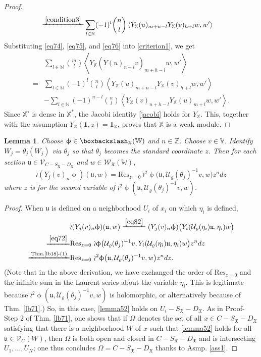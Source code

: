 \documentclass[11pt,b5paper,notitlepage]{article}
\theoremstyle{definition}
\theoremstyle{plain}
\newtheorem{lm}[df]{Lemma}
\newcommand{\fk}{\mathfrak}
\newcommand{\mc}{\mathcal}
\newcommand{\Res}{\mathrm{Res}}
\newcommand{\scr}{\mathscr}
\newcommand{\SX}{{S_{\fk X}}}
\newcommand{\DX}{D_{\fk X}}
\newcommand{\Vbb}{\mathbb V}
\newcommand{\Xbb}{\mathbb X}
\newcommand{\Wbb}{\mathbb W}
\newcommand{\Nbb}{\mathbb N}
\newcommand{\Zbb}{\mathbb Z}
\newcommand{\ibf}{\mathbf 1}
\newcommand{\<}{\left\langle}
\renewcommand{\>}{\right\rangle}
\newcommand{\fx}{\mathfrak{X}}
\numberwithin{equation}{section}
\begin{document}
\begin{proof}
\begin{align}
\xlongequal{\eqref{condition3}}&\sum_{l\in \Nbb}(-1)^l \binom{n}{l}\<Y_\Xbb(u)_{m+n-l}Y_\Xbb(v)_{h+l}w,w'\>  \label{eq76}
\end{align}
Substituting \eqref{eq74}, \eqref{eq75}, and \eqref{eq76} into \eqref{criterion1}, we get
\begin{align*}
&\sum_{l\in \Nbb}\binom{m}{l}\<Y_\Xbb(Y(u)_{n+l}v)_{m+h-l}w,w'\>\\
        =&\sum_{l\in \Nbb}(-1)^l \binom{n}{l}\<Y_\Xbb(u)_{m+n-l}Y_\Xbb(v)_{h+l}w,w'\>\\
&-\sum_{l\in \Nbb}(-1)^{n-l}\binom{n}{l}\<Y_\Xbb(v)_{n+h-l}Y_\Xbb(u)_{m+l}w,w'\>.
\end{align*}
Since $\Xbb^\circ$ is dense in $\Xbb^*$, the Jacobi identity \eqref{jacobi} holds for $Y_\Xbb$.    This, together with the assumption $Y_\Xbb(\ibf,z)=\ibf_\Xbb$, proves that $\Xbb$ is a weak module.
\end{proof}



\begin{lm}\label{lb23}
Choose $\upphi\in \boxbackslash_{\fx}(\Wbb)$ and $n\in \Zbb$. Choose $v\in\Vbb$. Identify $W_j=\theta_j(W_j)$ via $\theta_j$ so that $\theta_j$ becomes the standard coordinate $z$. Then for each section $\fk u\in\scr V_{C-\SX-\DX}$ and $w\in\scr W_{\fk X}(\Wbb)$,
    \begin{equation}\label{lemma52}
    \wr(Y_j(v)_n\upphi)(\fk u,w)=\Res_{z=0}~{\wr^2\upphi}\big(\fk u,\mc U_\varrho(\theta_j)^{-1}v,w\big)z^n dz
    \end{equation}
where $z$ is for the second variable of ${\wr^2\upphi}(\fk u,\mc U_\varrho(\theta_j)^{-1}v,w)$.
\end{lm}
\begin{proof}
When $\fk u$ is defined on a neighborhood $U_i$ of $x_i$ on which $\eta_i$ is defined, 
\begin{align*}
 & {\wr(Y_j(v)_n\upphi)}(\fk u,w)\xlongequal{\eqref{eq82}}(Y_j(v)_n\upphi)\big(Y_i(\mc U_\varrho(\eta_i)\fk u,\eta_i)w\big)\\
\xlongequal{\eqref{eq72}}&\Res_{z=0}~{\wr\upphi}\big(\mc U_\varrho(\theta_j)^{-1}v,Y_i(\mc U_\varrho(\eta_i)\fk u,\eta_i)w\big)z^n dz\\
\xlongequal{\text{Thm.\ref{lb18}-(1)}}&\Res_{z=0}~{\wr^2 \upphi}\big(\fk u,\mc U_\varrho(\theta_j)^{-1}v,w\big)z^n dz.
\end{align*}
(Note that in the above derivation, we have exchanged the order of $\Res_{z=0}$ and the infinite sum in the Laurent series about the variable $\eta_i$. This is legitimate because ${\wr^2 \upphi}(\fk u,\mc U_\varrho(\theta_j)^{-1}v,w)$ is holomorphic, or alternatively because of Thm. \ref{lb71}.)    So, in this case, \eqref{lemma52} holds on $U_i-\SX-\DX$. As in Proof-Step 2 of Thm. \ref{lb71}, one shows that if $\Omega$ denotes the set of all $x\in C-\SX-\DX$ satisfying that there is a neighborhood $W$ of $x$ such that \eqref{lemma52} holds for all $\fk u\in\scr V_C(W)$, then $\Omega$ is both open and closed in $C-\SX-\DX$ and is intersecting $U_1,\dots,U_N$; one thus concludes $\Omega=C-\SX-\DX$ thanks to Asmp. \ref{ass1}.
\end{proof}
\end{document}
